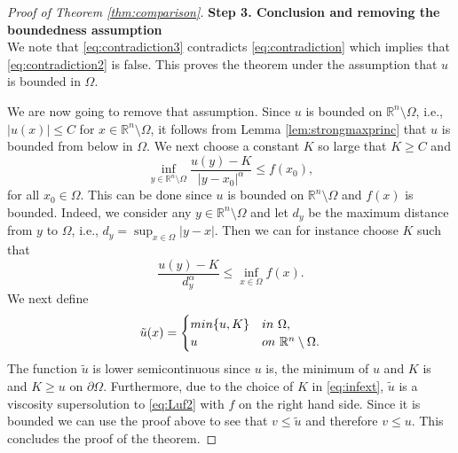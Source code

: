 \documentclass[10pt,a4paper]{amsart}
\providecommand{\Rn}{\mathbb{R}^n}
\begin{document}
\begin{proof}[Proof of Theorem \ref{thm:comparison}]
\textbf{Step 3. Conclusion and removing the boundedness assumption}\\
We note that \eqref{eq:contradiction3} contradicts \eqref{eq:contradiction} which implies that \eqref{eq:contradiction2} is false. This proves the theorem under the assumption that $u$ is bounded in $\Omega$. 

We are now going to remove that assumption. Since $u$ is bounded on $\Rn \setminus \Omega$, i.e., $|u(x)|\leq C$ for $x \in \Rn \setminus \Omega$, it follows from Lemma \ref{lem:strongmaxprinc} that $u$ is bounded from below in $\Omega$. We next choose a constant $K$ so large that $K \geq C$ and 
\begin{equation}\label{eq:infext}
  \inf_{y \in \Rn \setminus \Omega} \frac{u(y)-K}{|y-x_0|^{\alpha}} \leq f(x_0),  
\end{equation}
for all $x_0 \in \Omega$. This can be done since $u$ is bounded on $\Rn \setminus \Omega$ and $f(x)$ is bounded. Indeed, we consider any $y \in \Rn \setminus \Omega$ and let $d_y$ be the maximum distance from $y$ to $\Omega$, i.e., $d_y = \sup_{x \in \Omega} |y-x|$. Then we can for instance choose $K$ such that
$$
\frac{u(y)-K}{d^{\alpha}_y} \leq \inf_{x \in \Omega} f(x).
$$
We next define
\begin{align*}
   \tilde{u}(x) =   \begin{cases}
                    \textup{min}\{u, K\} & \textup{in  } \ \Omega, \\
                    u    & \textup{on  } \ \Rn \setminus \Omega.
     \end{cases}
\end{align*}
The function $\tilde{u}$ is lower semicontinuous since $u$ is, the minimum of $u$ and $K$ is and $K \geq u$ on $\partial \Omega$. Furthermore, due to the choice of $K$ in \eqref{eq:infext}, $\tilde{u}$ is a viscosity supersolution to \eqref{eq:Luf2} with $f$ on the right hand side. Since it is bounded we can use the proof above to see that $v \leq \tilde{u}$ and therefore $v \leq u$. This concludes the proof of the theorem.
\end{proof}
\end{document}
